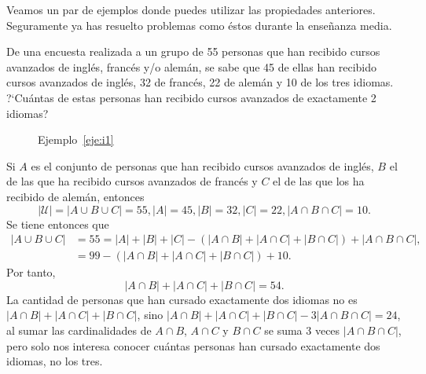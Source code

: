 \medskip

Veamos un par de ejemplos donde puedes utilizar las propiedades anteriores.
Seguramente ya has resuelto problemas como \'estos durante la ense\~nanza
media.



\begin{ejemplo}\label{eje:i1}
	De una encuesta realizada a un grupo de 55 personas que han recibido
	cursos avanzados de ingl\'es, franc\'es y/o alem\'an, se sabe que
	45 de ellas han recibido cursos avanzados de ingl\'es, 32 de 
	franc\'es, 22 de alem\'an y 10 de los tres idiomas. 
	?`Cu\'antas de estas personas
	han recibido cursos avanzados de exactamente 2 idiomas?\\
	
	\begin{center}
	\begin{figure}[h!]
		\begin{center}
		\end{center}
		\caption{Ejemplo~\ref{eje:i1}}
	\end{figure}
\end{center}
	
	Si $A$ es el conjunto de personas que han recibido cursos avanzados de ingl\'es,
	$B$ el de las que ha recibido cursos avanzados de franc\'es y
	$C$ el de las que los ha recibido de alem\'an, entonces
	\[
		|{\mathcal U}| = |A\cup B\cup C| = 55, |A| = 45, |B| = 32, |C| = 22,
		|A\cap B\cap C| = 10.
	\]
	Se tiene entonces que
	\begin{align*}
		|A\cup B \cup C| &= 55 = |A| + |B| + |C| - 
		(|A\cap B| + |A\cap C| + |B\cap C|) + 	|A\cap B\cap C|,\\
		&= 99 - (|A\cap B| + |A\cap C| + |B\cap C|) + 10.
	\end{align*}
	Por tanto,
	\[
		|A\cap B| + |A\cap C| + |B\cap C| = 54.
	\]
	La cantidad de personas que han cursado exactamente dos idiomas
	no es $|A\cap B| + |A\cap C| + |B\cap C|$, sino 
	$|A\cap B| + |A\cap C| + |B\cap C| - 3|A\cap B\cap C| = 24$, 
	al sumar las cardinalidades 
	de $A\cap B$, $A\cap C$ y $B\cap C$ se suma 3 veces 
	$|A\cap B\cap C|$, pero solo nos interesa conocer cu\'antas
	personas han cursado exactamente dos idiomas, no los tres.			
\end{ejemplo}

